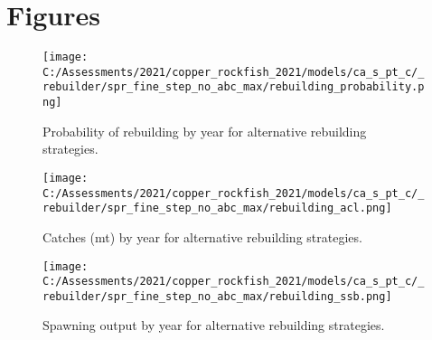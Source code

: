 \documentclass[11pt,
  english,
  a4paper,
]{article}
\begin{document}
\leavevmode\tagmcend\tagstructend\par
\endgroup{}
\endgroup{}

\clearpage


\hypertarget{figures}{%
\section{Figures}\label{figures}}

\leavevmode\tagmcend\tagstructend


\begin{figure}
\centering
\texttt{[image: C:/Assessments/2021/copper\_rockfish\_2021/models/ca\_s\_pt\_c/\_rebuilder/spr\_fine\_step\_no\_abc\_max/rebuilding\_probability.png]}
\caption{Probability of rebuilding by year for alternative rebuilding strategies.\label{fig:prob-fig}}
\end{figure}

\tagmcend\tagstructend


\begin{figure}
\centering
\texttt{[image: C:/Assessments/2021/copper\_rockfish\_2021/models/ca\_s\_pt\_c/\_rebuilder/spr\_fine\_step\_no\_abc\_max/rebuilding\_acl.png]}
\caption{Catches (mt) by year for alternative rebuilding strategies.\label{fig:acl-fig}}
\end{figure}

\tagmcend\tagstructend


\begin{figure}
\centering
\texttt{[image: C:/Assessments/2021/copper\_rockfish\_2021/models/ca\_s\_pt\_c/\_rebuilder/spr\_fine\_step\_no\_abc\_max/rebuilding\_ssb.png]}
\caption{Spawning output by year for alternative rebuilding strategies.\label{fig:ssb-fig}}
\end{figure}

\tagmcend\tagstructend
\end{document}
